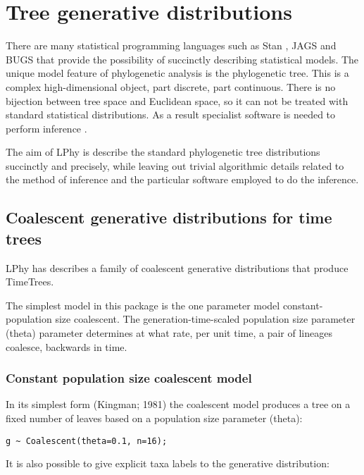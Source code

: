 \documentclass[oneside]{article}
\begin{document}
\section{Tree generative distributions}

There are many statistical programming languages such as Stan
\cite{carpenter2017stan}, JAGS \cite{plummer2003jags} and BUGS \cite{lunn2009bugs, gilks1994language} that provide the possibility
of succinctly describing statistical models. The unique model feature of
phylogenetic analysis is the phylogenetic tree.
This is a complex high-dimensional object, part discrete, part
continuous.
There is no bijection between tree space and Euclidean space, so it
can not be treated with standard statistical distributions.
As a result specialist software is needed to perform inference \cite{hohna2016revbayes,bouckaert2019beastanalysis}.

The aim of LPhy is describe the standard phylogenetic tree
distributions succinctly and precisely, while leaving out trivial algorithmic details related to the method
of inference and the particular software employed to do the inference.

\subsection{Coalescent generative distributions for time trees}

LPhy has describes a family of coalescent generative distributions
that produce TimeTrees.

The simplest model in this package is the one parameter model
constant-population size coalescent.
The generation-time-scaled population size parameter (theta) parameter determines at
what rate, per unit time, a pair of lineages coalesce, backwards in time.

\subsubsection{Constant population size coalescent model}

In its simplest form (Kingman; 1981) the coalescent model produces a
tree on a fixed number of leaves based on a population size parameter (theta):

\begin{verbatim}
g ~ Coalescent(theta=0.1, n=16);
\end{verbatim}

It is also possible to give explicit taxa labels to the generative
distribution: 
\end{document}
